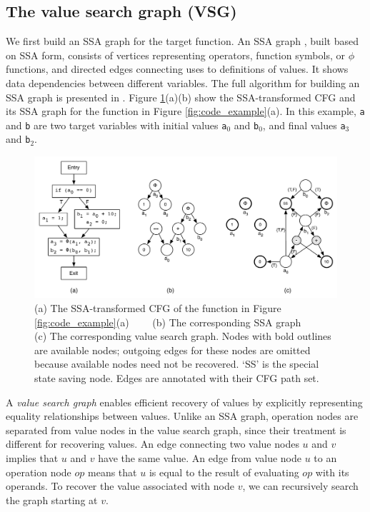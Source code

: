 \documentclass[12pt]{gatech-thesis}
\begin{document}
\subsection{The value search graph (VSG)}
We first build an SSA graph for the target function.
An SSA graph \cite{Alpern1988,Cooper2001}, built based on SSA form, consists of vertices representing operators, function symbols, or $\phi$ functions, and directed edges connecting uses to definitions of values. It shows data dependencies between different variables. 
The full algorithm for building an SSA graph is presented in \cite{Muchnick}. 
Figure \ref{fig:VSG}(a)(b) show the SSA-transformed CFG and its SSA graph for the function in Figure \ref{fig:code_example}(a). In this example, \texttt{a} and \texttt{b} are two target variables with initial values \texttt{a$_0$} and \texttt{b$_0$}, and final values \texttt{a$_3$} and \texttt{b$_2$}.

\begin{figure}
\centering
\includegraphics[width=400pt]{figures1/CFG.pdf}
\caption{(a) The SSA-transformed CFG of the function in Figure \ref{fig:code_example}(a)$\quad\quad$ (b) The corresponding SSA graph $\quad\quad$ (c) The corresponding value search graph. Nodes with bold outlines are available nodes; outgoing edges for these nodes are omitted because available nodes need not be recovered. `SS' is the special state saving node. Edges are annotated with their CFG path set.}
\label{fig:VSG}
\end{figure}




A \emph{value search graph} enables efficient recovery of values by explicitly representing equality relationships between values. 
Unlike an SSA graph, operation nodes are separated from value nodes in the value search graph, since their treatment is different for recovering values.
An edge connecting two value nodes $u$ and $v$ implies that $u$ and $v$ have the same value. 
An edge from value node $u$ to an operation node $op$ means that  $u$ is equal to the result of evaluating $op$ with its operands. 
To recover the value associated with node $v$, we can recursively search the graph starting at $v$.  
\end{document}
